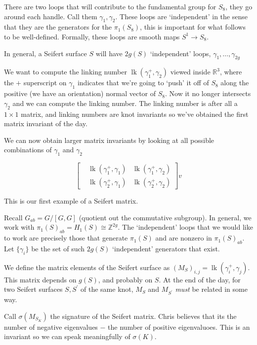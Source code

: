 \documentclass[11pt]{article}
\newcommand{\Z}{\mathbb{Z}}
\newcommand{\R}{\mathbb{R}}
\newcommand{\set}[1]{\{ #1 \}}
\DeclareMathOperator{\lk}{lk}
\theoremstyle{plain}
\theoremstyle{definition}
\begin{document}
There are two loops that will contribute to the fundamental group for $S_8$, they go around each handle. Call them $\gamma_1, \gamma_2$. These loops are `independent' in the sense that they are the generators for the $\pi_1(S_8)$, this
is important for what follows to be well-defined.
Formally, these loops are smooth maps $S^1 \to S_8$.

In general, a Seifert surface $S$ will have $2g(S)$ `independent' loops, $\gamma_1, \ldots, \gamma_{2g}$

We want to compute the linking number $\lk(\gamma_1^{+}, \gamma_2)$ viewed inside $\R^3$, where the $+$ superscript on $\gamma_1$ indicates that we're going to `push' it off of $S_8$ along the positive
(we have an orientation) normal vector of $S_8$. Now it no longer intersects $\gamma_2$ and we can compute the linking number. The linking number is after all a $1 \times 1$ matrix, and linking numbers are knot invariants so we've
obtained the first matrix invariant of the day.

We can now obtain larger matrix invariants by looking at all possible combinations of $\gamma_1$ and $\gamma_2$


\begin{equation}
\left[
\begin{matrix}
  &\lk(\gamma_1^+, \gamma_1) &\lk(\gamma_1^+, \gamma_2) \\
  &\lk(\gamma_2^+, \gamma_1) &\lk(\gamma_2^+, \gamma_2)
\end{matrix}
\right]v
\end{equation}

This is our first example of a Seifert matrix.

Recall $G_{ab} = G / [G, G]$ (quotient out the commutative subgroup). In general, we work with $\pi_1{(S)}_{ab} = H_1(S) \cong \Z^{2g}$. The `independent' loops that we would like to work are precisely those that generate $\pi_1(S)$ and
are nonzero in $\pi_1{(S)}_{ab}$. Let $\set{\gamma_i}$ be the set of such $2g(S)$ `independent' generators that exist.

We define the matrix elements of the Seifert surface as ${(M_S)}_{i,j} = \lk(\gamma_i^+, \gamma_j)$. This matrix depends on $g(S)$, and probably on $S$. At the end of the day, for two Seifert surfaces $S, S^\prime$ of the same knot,
$M_S$ and $M_{S^\prime}$ \emph{must} be related in some way.

Call $\sigma(M_{S_K})$ the signature of the Seifert matrix. Chris believes that its the number of negative eigenvalues $-$ the number of positive eigenvaluoes. This is an invariant so we can speak meaningfully of $\sigma(K)$.
\end{document}
